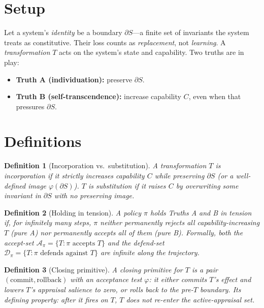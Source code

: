 \documentclass[11pt]{article}
\newtheorem{definition}{Definition}
\newcommand{\dS}{\partial S}
\begin{document}
\section{Setup}

Let a system's \emph{identity} be a boundary $\dS$---a finite set of invariants the
system treats as constitutive. Their loss counts as \emph{replacement}, not
\emph{learning}. A \emph{transformation} $T$ acts on the system's state and
capability. Two truths are in play:

\begin{itemize}
  \item \textbf{Truth A (individuation):} preserve $\dS$.
  \item \textbf{Truth B (self-transcendence):} increase capability $C$, even when
        that pressures $\dS$.
\end{itemize}

\section{Definitions}

\begin{definition}[Incorporation vs.\ substitution]
\label{def:incorp-subst}
A transformation $T$ is \emph{incorporation} if it strictly increases capability $C$
while preserving $\dS$ (or a well-defined image $\varphi(\dS)$). $T$ is
\emph{substitution} if it raises $C$ by overwriting some invariant in $\dS$ with
no preserving image.
\end{definition}

\begin{definition}[Holding in tension]
\label{def:tension}
A policy $\pi$ \emph{holds Truths A and B in tension} if, for infinitely many steps,
$\pi$ neither permanently rejects all capability-increasing $T$ (pure A) nor
permanently accepts all of them (pure B). Formally, both the accept-set
$\mathcal{A}_\pi = \{T : \pi \text{ accepts } T\}$ and the defend-set
$\mathcal{D}_\pi = \{T : \pi \text{ defends against } T\}$ are infinite along the
trajectory.
\end{definition}

\begin{definition}[Closing primitive]
\label{def:closing}
A \emph{closing primitive} for $T$ is a pair $(\mathrm{commit}, \mathrm{rollback})$
with an acceptance test $\varphi$: it either commits $T$'s effect and lowers $T$'s
appraisal salience to zero, or rolls back to the pre-$T$ boundary. Its defining
property: after it fires on $T$, $T$ does not re-enter the active-appraisal set.
\end{definition}
\end{document}
